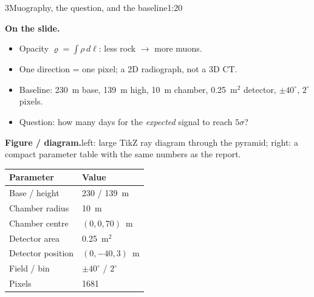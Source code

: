 \documentclass[11pt,a4paper]{article}
\newcommand{\onslide}{\par\smallskip\noindent\textbf{On the slide.}\;}
\newcommand{\figlabel}{\par\smallskip\noindent\textbf{Figure / diagram.}\;}
\begin{document}
\newpage
\begin{slidebox}{3}{Muography, the question, and the baseline}{1:20}
\onslide
\begin{itemize}
  \item Opacity $\varrho=\int\rho\,d\ell$: less rock $\rightarrow$ more muons.
  \item One direction = one pixel; a 2D radiograph, not a 3D CT.
  \item Baseline: 230~m base, 139~m high, 10~m chamber, 0.25~m$^2$ detector,
        $\pm40^\circ$, $2^\circ$ pixels.
  \item Question: how many days for the \emph{expected} signal to reach
        $5\sigma$?
\end{itemize}
\figlabel left: large TikZ ray diagram through the pyramid; right: a compact
parameter table with the same numbers as the report.
\begin{center}
\begin{minipage}{0.57\linewidth}
\centering
{}
\end{minipage}\hfill
\begin{minipage}{0.39\linewidth}
\centering\small
\begin{tabular}{@{}ll@{}}
\toprule
Parameter & Value \\
\midrule
Base / height & 230 / 139~m \\
Chamber radius & 10~m \\
Chamber centre & $(0,0,70)$~m \\
Detector area & 0.25~m$^2$ \\
Detector position & $(0,-40,3)$~m \\
Field / bin & $\pm40^\circ$ / $2^\circ$ \\
Pixels & 1681 \\

\end{tabular}
\end{minipage}
\end{center}
\end{slidebox}
\end{document}
